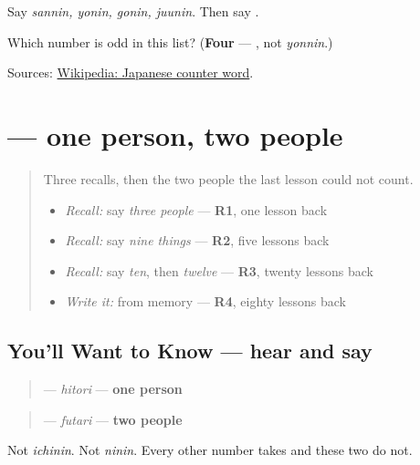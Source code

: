 Say \emph{sannin, yonin, gonin, juunin}. Then say \textbf{ }.

\begin{tcolorbox}[breakable,colback=teal!4,colframe=teal!35!black,title={Before you move on}]
Which number is odd in this list? (\textbf{Four} — \textbf{}, not \emph{yonnin}.)

Sources: \href{https://en.wikipedia.org/wiki/Japanese\_counter\_word}{Wikipedia: Japanese counter word}.
\end{tcolorbox}
\section[\texorpdfstring{\ja{ひとり} \ja{ふたり} (hitori futari)}{ひとり ふたり (hitori futari)}]{ — one person, two people}

\label{lesson:JA-C18-hitori-futari}



\begin{quote}
Three recalls, then the two people the last lesson could not count.

\begin{itemize}
\raggedright
  \item \emph{Recall:} say \emph{three people} — \textbf{R1}, one lesson back
  \item \emph{Recall:} say \emph{nine things} — \textbf{R2}, five lessons back
  \item \emph{Recall:} say \emph{ten}, then \emph{twelve} — \textbf{R3}, twenty lessons back
  \item \emph{Write it:} \textbf{} from memory — \textbf{R4}, eighty lessons back
\end{itemize}
\end{quote}

\subsection*{You'll Want to Know — hear and say}
\begin{quote}
\textbf{} — \emph{hitori} — \textbf{one person}
\end{quote}

\begin{quote}
\textbf{} — \emph{futari} — \textbf{two people}
\end{quote}

Not \emph{ichinin}. Not \emph{ninin}. Every other number takes \textbf{} and these two do not.

